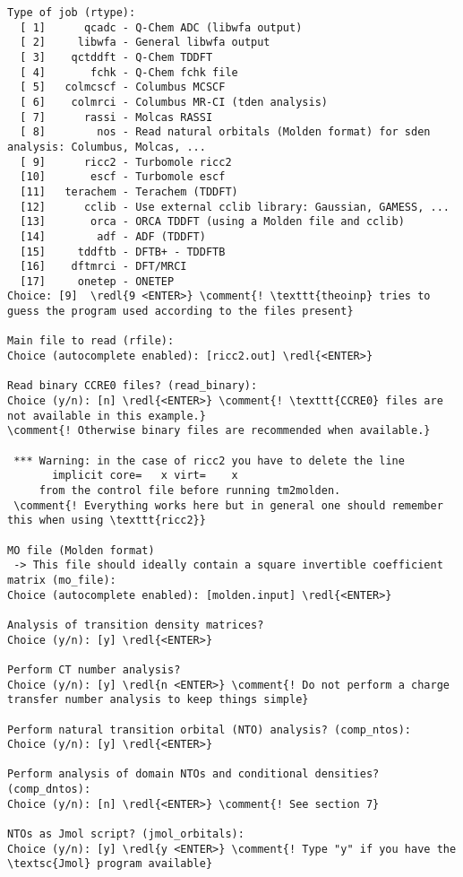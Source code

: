 \documentclass[DIV=12,headings=normal]{scrartcl}
\newcommand{\comment}[1]{\textcolor{blue}{#1}}
\newcommand{\redl}[1]{{\textcolor{red}{\texttt{#1}}}}
\newcounter{number}
\begin{document}
\scriptsize
\begin{Verbatim}[commandchars=\\\{\}]
Type of job (rtype):
  [ 1]      qcadc - Q-Chem ADC (libwfa output)
  [ 2]     libwfa - General libwfa output
  [ 3]    qctddft - Q-Chem TDDFT
  [ 4]       fchk - Q-Chem fchk file
  [ 5]   colmcscf - Columbus MCSCF
  [ 6]    colmrci - Columbus MR-CI (tden analysis)
  [ 7]      rassi - Molcas RASSI
  [ 8]        nos - Read natural orbitals (Molden format) for sden analysis: Columbus, Molcas, ...
  [ 9]      ricc2 - Turbomole ricc2
  [10]       escf - Turbomole escf
  [11]   terachem - Terachem (TDDFT)
  [12]      cclib - Use external cclib library: Gaussian, GAMESS, ...
  [13]       orca - ORCA TDDFT (using a Molden file and cclib)
  [14]        adf - ADF (TDDFT)
  [15]     tddftb - DFTB+ - TDDFTB
  [16]    dftmrci - DFT/MRCI
  [17]     onetep - ONETEP
Choice: [9]  \redl{9 <ENTER>} \comment{! \texttt{theoinp} tries to guess the program used according to the files present}

Main file to read (rfile):
Choice (autocomplete enabled): [ricc2.out] \redl{<ENTER>}

Read binary CCRE0 files? (read_binary):
Choice (y/n): [n] \redl{<ENTER>} \comment{! \texttt{CCRE0} files are not available in this example.}
\comment{! Otherwise binary files are recommended when available.}

 *** Warning: in the case of ricc2 you have to delete the line
       implicit core=   x virt=    x
     from the control file before running tm2molden.
 \comment{! Everything works here but in general one should remember this when using \texttt{ricc2}}

MO file (Molden format)
 -> This file should ideally contain a square invertible coefficient matrix (mo_file):
Choice (autocomplete enabled): [molden.input] \redl{<ENTER>}

Analysis of transition density matrices?
Choice (y/n): [y] \redl{<ENTER>}

Perform CT number analysis?
Choice (y/n): [y] \redl{n <ENTER>} \comment{! Do not perform a charge transfer number analysis to keep things simple}

Perform natural transition orbital (NTO) analysis? (comp_ntos):
Choice (y/n): [y] \redl{<ENTER>}

Perform analysis of domain NTOs and conditional densities? (comp_dntos):
Choice (y/n): [n] \redl{<ENTER>} \comment{! See section 7}

NTOs as Jmol script? (jmol_orbitals):
Choice (y/n): [y] \redl{y <ENTER>} \comment{! Type "y" if you have the \textsc{Jmol} program available}


\end{Verbatim}
\end{document}

